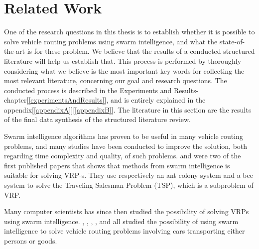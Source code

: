 \section{Related Work} 
One of the research questions in this thesis is to establish whether it is possible to solve vehicle routing problems using swarm intelligence, and what the state-of-the-art is for these problem. We believe that the results of a conducted structured literature will help us establish that. This process is performed by thoroughly considering what we believe is the most important key words for collecting the most relevant literature, concerning our goal and research questions. The conducted process is described in the Experiments and Results-chapter[\ref{experimentsAndResults}], and is entirely explained in the appendix[\ref{appendixA}][\ref{appendixB}]. The literature in this section are the results of the final data synthesis of the structured literature review. \newline

Swarm intelligence algorithms has proven to be useful in many vehicle routing problems, and many studies have been conducted to improve the solution, both regarding time complexity and quality, of such problems. \citet{dorigo97} and \citet{lucic03} were two of the first published papers that shows that methods from swarm intelligence is suitable for solving VRP-s. They use respectively an ant colony system and a bee system to solve the Traveling Salesman Problem (TSP), which is a subproblem of VRP. 

Many computer scientists has since then studied the possibility of solving VRPs using swarm intelligence. \citet{hsiao04}, \citet{salehi-nezhad07}, \citet{tripathi09}, \citet{dias14}, and \citet{sedighpour14} all studied the possibility of using swarm intelligence to solve vehicle routing problems involving cars transporting either persons or goods. 

